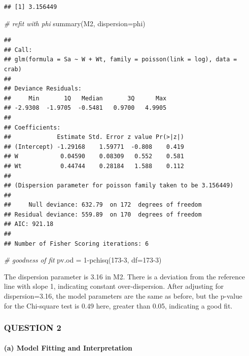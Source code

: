 \documentclass[
]{article}
\newenvironment{Shaded}{\begin{snugshade}}{\end{snugshade}}
\newcommand{\AttributeTok}[1]{\textcolor[rgb]{0.77,0.63,0.00}{#1}}
\newcommand{\CommentTok}[1]{\textcolor[rgb]{0.56,0.35,0.01}{\textit{#1}}}
\newcommand{\DecValTok}[1]{\textcolor[rgb]{0.00,0.00,0.81}{#1}}
\newcommand{\FunctionTok}[1]{\textcolor[rgb]{0.00,0.00,0.00}{#1}}
\newcommand{\NormalTok}[1]{#1}
\newcommand{\OtherTok}[1]{\textcolor[rgb]{0.56,0.35,0.01}{#1}}
\newcommand{\SpecialCharTok}[1]{\textcolor[rgb]{0.00,0.00,0.00}{#1}}
\begin{document}
\begin{verbatim}
## [1] 3.156449
\end{verbatim}

\begin{Shaded}
\begin{Highlighting}[]
\CommentTok{\# refit with phi}
\FunctionTok{summary}\NormalTok{(M2, }\AttributeTok{dispersion=}\NormalTok{phi)}
\end{Highlighting}
\end{Shaded}

\begin{verbatim}
## 
## Call:
## glm(formula = Sa ~ W + Wt, family = poisson(link = log), data = crab)
## 
## Deviance Residuals: 
##     Min       1Q   Median       3Q      Max  
## -2.9308  -1.9705  -0.5481   0.9700   4.9905  
## 
## Coefficients:
##             Estimate Std. Error z value Pr(>|z|)
## (Intercept) -1.29168    1.59771  -0.808    0.419
## W            0.04590    0.08309   0.552    0.581
## Wt           0.44744    0.28184   1.588    0.112
## 
## (Dispersion parameter for poisson family taken to be 3.156449)
## 
##     Null deviance: 632.79  on 172  degrees of freedom
## Residual deviance: 559.89  on 170  degrees of freedom
## AIC: 921.18
## 
## Number of Fisher Scoring iterations: 6
\end{verbatim}

\begin{Shaded}
\begin{Highlighting}[]
\CommentTok{\# goodness of fit}
\NormalTok{pv.od }\OtherTok{=} \DecValTok{1}\SpecialCharTok{{-}}\FunctionTok{pchisq}\NormalTok{(}\DecValTok{173{-}3}\NormalTok{, }\AttributeTok{df=}\DecValTok{173{-}3}\NormalTok{)}
\end{Highlighting}
\end{Shaded}

The dispersion parameter is 3.16 in M2. There is a deviation from the
reference line with slope 1, indicating constant over-dispersion. After
adjusting for dispersion=3.16, the model parameters are the same as
before, but the p-value for the Chi-square test is 0.49 here, greater
than 0.05, indicating a good fit.

\hypertarget{question-2}{%
\subsubsection{QUESTION 2}\label{question-2}}

\hypertarget{a-model-fitting-and-interpretation-1}{%
\paragraph{(a) Model Fitting and
Interpretation}\label{a-model-fitting-and-interpretation-1}}
\end{document}
